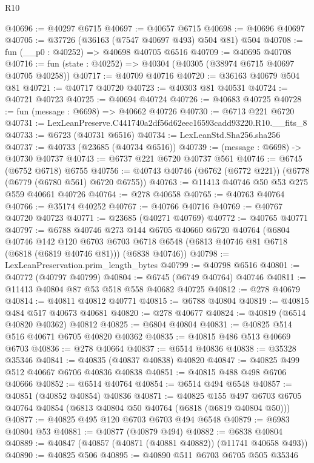 \begin{lexlean}{R10}
\begin{coremodule}
@40696 := @40297 @6715
@40697 := @40657 @6715
@40698 := @40696 @40697
@40705 := @37726 (@36163 (@7547 @40697 @493) @504 @81) @504
@40708 := fun (__p0 : @40252) => @40698 @40705 @6516
@40709 := @40695 @40708
@40716 := fun (state : @40252) => @40304 (@40305 (@38974 @6715 @40697 @40705 @40258))
@40717 := @40709 @40716
@40720 := @36163 @40679 @504 @81
@40721 := @40717 @40720
@40723 := @40303 @81 @40531
@40724 := @40721 @40723
@40725 := @40694 @40724
@40726 := @40683 @40725
@40728 := fun (message : @6698) => @40662 @40726
@40730 := @6713 @221 @6720
@40731 := LexLeanPreserve.C441740a2df56d62eec16593cadd93220.R10.__fits_8
@40733 := @6723 (@40731 @6516)
@40734 := LexLeanStd.Sha256.sha256
@40737 := @40733 (@23685 (@40734 @6516))
@40739 := (message : @6698) -> @40730 @40737
@40743 := @6737 @221 @6720 @40737 @561
@40746 := @6745 (@6752 @6718) @6755
@40756 := @40743 @40746 (@6762 (@6772 @221)) (@6778 (@6779 (@6780 @561) @6720 @6755))
@40763 := @11413 @40746 @50 @53 @275 @559 @40661 @40726
@40764 := @278 @40658
@40765 := @40763 @40764
@40766 := @35174 @40252
@40767 := @40766 @40716
@40769 := @40767 @40720 @40723
@40771 := @23685 (@40271 @40769)
@40772 := @40765 @40771
@40797 := @6788
    @40746
    @273
    @144
    @6705
    @40660
    @6720
    @40764
    (@6804
      @40746
      @142
      @120
      @6703
      @6703
      @6718
      @6548
      (@6813 @40746 @81 @6718 (@6818 (@6819 @40746 @81)))
      (@6838 @40746))
@40798 := LexLeanPreservation.prim_length_bytes
@40799 := @40798 @6516
@40801 := @40772 (@40797 @40799)
@40804 := @6745 (@6749 @40764) @40746
@40811 := @11413 @40804 @87 @53 @518 @558 @40682 @40725
@40812 := @278 @40679
@40814 := @40811 @40812 @40771
@40815 := @6788 @40804
@40819 := @40815 @484 @517 @40673 @40681
@40820 := @278 @40677
@40824 := @40819 (@6514 @40820 @40362) @40812
@40825 := @6804 @40804
@40831 := @40825 @514 @516 @40671 @6705 @40820 @40362
@40835 := @40815 @486 @513 @40669 @6703
@40836 := @278 @40664
@40837 := @6514 @40836
@40838 := @35328 @35346
@40841 := @40835 (@40837 @40838) @40820
@40847 := @40825 @499 @512 @40667 @6706 @40836 @40838
@40851 := @40815 @488 @498 @6706 @40666
@40852 := @6514 @40764
@40854 := @6514 @494 @6548
@40857 := @40851 (@40852 @40854) @40836
@40871 := @40825
    @155
    @497
    @6703
    @6705
    @40764
    @40854
    (@6813 @40804 @50 @40764 (@6818 (@6819 @40804 @50)))
@40877 := @40825 @495 @120 @6703 @6703 @494 @6548
@40879 := @6983 @40804 @53
@40881 := @40877 (@40879 @494)
@40882 := @6838 @40804
@40889 := @40847 (@40857 (@40871 (@40881 @40882)) (@11741 @40658 @493))
@40890 := @40825 @506
@40895 := @40890 @511 @6703 @6705 @505 @35346

\end{coremodule}
\end{lexlean}
